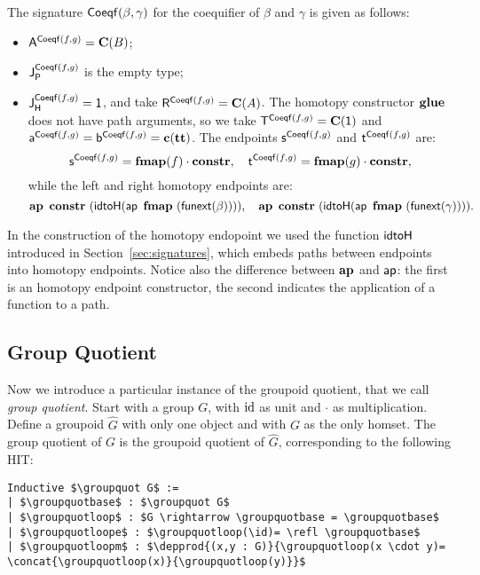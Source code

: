 The signature $\coequifier \beta \gamma$ for the coequifier of $\beta$
and $\gamma$ is given as follows:
\begin{itemize}
\item $\pointconstr[\coequifier f g] = \constantP{B}$;
\item $\pathlabel[\coequifier f g]$ is the empty type; 
\item $\homotlabel[\coequifier f g] = \unit$, and take 
  $\homotpointarg[\coequifier f g] = \constantP{A}$.
  The homotopy constructor $\coequifierglue$ does not have path arguments, so we take  
  $\homotpathtarg[\coequifier f g] = \constantP{\unit}$ and
  $\pathargleft[\coequifier f g] = \pathargright[\coequifier f g] = \Ce(\unitt)$.
  The endpoints $\homotpathleft[\coequifier f g]$ and $\homotpathright[\coequifier f g]$ are:
  \[
  \homotpathleft[\coequifier f g] = \comp{\fmap(f)}{\constr}, \quad
  \homotpathright[\coequifier f g] = \comp{\fmap(g)}{\constr},
  \]
  while the left and right homotopy endpoints are:
  \[
  \hap{\constr}{(\idtoH(\ap{\fmap}{(\funextsec(\beta))}))}, \quad
  \hap{\constr}{(\idtoH(\ap{\fmap}{(\funextsec(\gamma))}))}.
  \]
\end{itemize}
In the construction of the homotopy endopoint we used the function
$\idtoH$ introduced in Section~\ref{sec:signatures}, which embeds
paths between endpoints into homotopy endpoints. Notice also the
difference between $\constructor{ap}$ and $\constfont{ap}$: the first
is an homotopy endpoint constructor, the second indicates the
application of a function to a path.


\subsection{Group Quotient}
\label{sec:group_quotient}

Now we introduce a particular instance of the groupoid quotient, that
we call \emph{group quotient}. Start with a group $G$, with $\id$ as
unit and $\cdot$ as multiplication. Define a groupoid $\widehat{G}$
with only one object and with $G$ as the only homset. The group
quotient of $G$ is the groupoid quotient of $\widehat{G}$,
corresponding to the following HIT:
\begin{lstlisting}[mathescape=true]
Inductive $\groupquot G$ :=
| $\groupquotbase$ : $\groupquot G$
| $\groupquotloop$ : $G \rightarrow \groupquotbase = \groupquotbase$
| $\groupquotloope$ : $\groupquotloop(\id)= \refl \groupquotbase$
| $\groupquotloopm$ : $\depprod{(x,y : G)}{\groupquotloop(x \cdot y)= \concat{\groupquotloop(x)}{\groupquotloop(y)}}$
\end{lstlisting}


